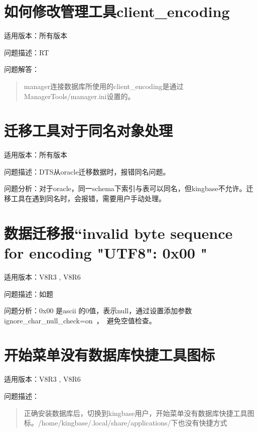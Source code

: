 \documentclass[letterpaper,10pt,english]{sphinxmanual}
\let\sphinxpxdimen\pdfpxdimen\else\newdimen\sphinxpxdimen
\begin{document}
\section{如何修改管理工具client\_encoding}
\label{\detokenize{tools:client-encoding}}
适用版本：所有版本

问题描述：RT

问题解答：
\begin{quote}

manager连接数据库所使用的client\_encoding是通过ManagerTools/manager.ini设置的。

\begin{figure}[htbp]
\centering

\noindent\sphinxincludegraphics[width=510\sphinxpxdimen,height=128\sphinxpxdimen]{{FAQ29287}.png}
\end{figure}
\end{quote}


\section{迁移工具对于同名对象处理}
\label{\detokenize{tools:id2}}
适用版本：所有版本

问题描述：DTS从oracle迁移数据时，报错同名问题。

问题分析：对于oracle，同一schema下索引与表可以同名，但kingbase不允许。迁移工具在遇到同名时，会报错，需要用户手动处理。


\section{数据迁移报“invalid byte sequence for encoding "UTF8": 0x00 "}
\label{\detokenize{tools:invalid-byte-sequence-for-encoding-utf8-0x00}}
适用版本：V8R3 , V8R6

问题描述：如题

问题分析：0x00 是ascii 的0值，表示null，通过设置添加参数ignore\_char\_null\_check=on ， 避免空值检查。


\section{开始菜单没有数据库快捷工具图标}
\label{\detokenize{tools:id3}}
适用版本：V8R3 , V8R6

问题描述：
\begin{quote}

正确安装数据库后，切换到kingbase用户，开始菜单没有数据库快捷工具图标。/home/kingbase/.local/share/applications/下也没有快捷方式
\end{quote}
\end{document}

